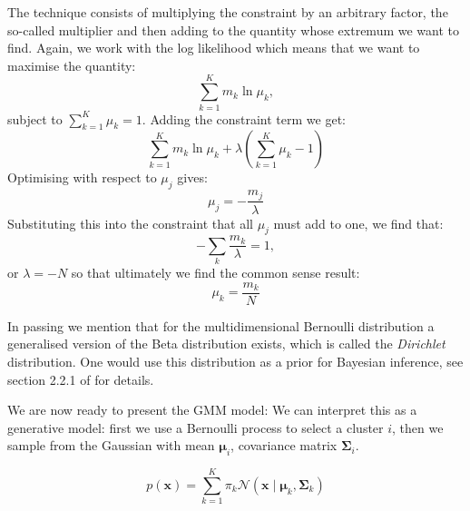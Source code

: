 The technique consists of multiplying the constraint by an arbitrary factor, the so-called multiplier and then adding to the quantity whose extremum we want to find.
Again, we work with the log likelihood which means that we want to maximise the quantity:
$$
\sum^K_{k=1} m_k \ln \mu_k,
$$
subject to $\sum^K_{k=1} \mu_k = 1$.
Adding the constraint term we get:
$$
\sum^K_{k=1} m_k \ln \mu_k + \lambda( \sum^K_{k=1} \mu_k - 1)
$$
Optimising with respect to $\mu_j$ gives:
$$
\mu_j = -\frac{m_j}{\lambda}
$$
Substituting this into the constraint that all $\mu_j$ must add to one,
we find that:
$$
- \sum_k \frac{m_k}{\lambda} = 1, 
$$
or $\lambda = -N$ so that ultimately we find the common sense result:
$$
\mu_k = \frac{m_k}{N}
$$

In passing we mention that for the multidimensional Bernoulli distribution a generalised version of the Beta distribution exists, which is called the \emph{Dirichlet} distribution.
One would use this distribution as a prior for Bayesian inference, see section 2.2.1 of \cite{bishop2006} for details.




We are now ready to present the GMM model:
We can interpret this as a generative model: first we use a Bernoulli process to select a cluster $i$, then we sample from the Gaussian with mean $\boldsymbol{\mu}_i$,
covariance matrix $\boldsymbol{\Sigma}_i$.

\begin{equation}
p(\boldsymbol{x}) = \sum^K_{k=1} \pi_k \mathcal{N}(\boldsymbol{x} \mid \boldsymbol{\mu}_k, \boldsymbol{\Sigma}_k)
\label{eq-marg}
\end{equation}

